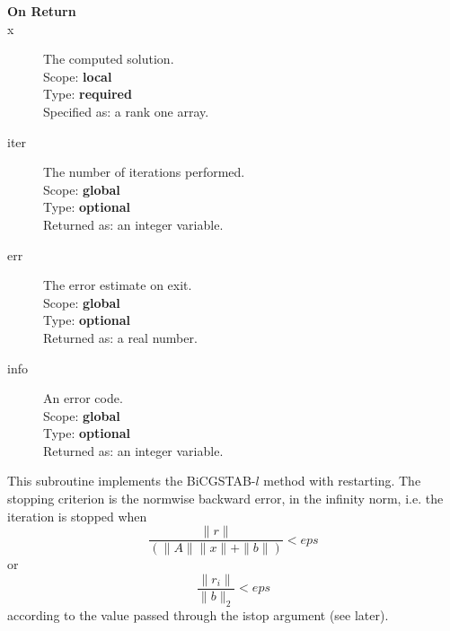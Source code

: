 \begin{description}
\item[\bf On Return] 
\item[x] The computed solution. \\
Scope: {\bf local} \\
Type: {\bf required}\\
Specified as: a rank one array.
\item[iter]  The number of iterations performed.\\
Scope: {\bf global} \\
Type: {\bf optional}\\
Returned  as: an integer variable.
\item[err]  The error estimate on exit.\\
Scope: {\bf global} \\
Type: {\bf optional}\\
Returned  as: a real number.
\item[info]  An error code.\\
Scope: {\bf global} \\
Type: {\bf optional}\\
Returned  as: an integer variable.
\end{description}


%
%

This subroutine implements the BiCGSTAB-$l$ method with restarting. The
stopping criterion is the normwise backward error, in the infinity
norm, i.e. the iteration is stopped when 
\[ \frac{\|r\|}{(\|A\|\|x\|+\|b\|)} < eps \]
or
\[ \frac{\|r_i\|}{\|b\|_2} < eps \]
according to the value passed through the  istop argument (see later).



